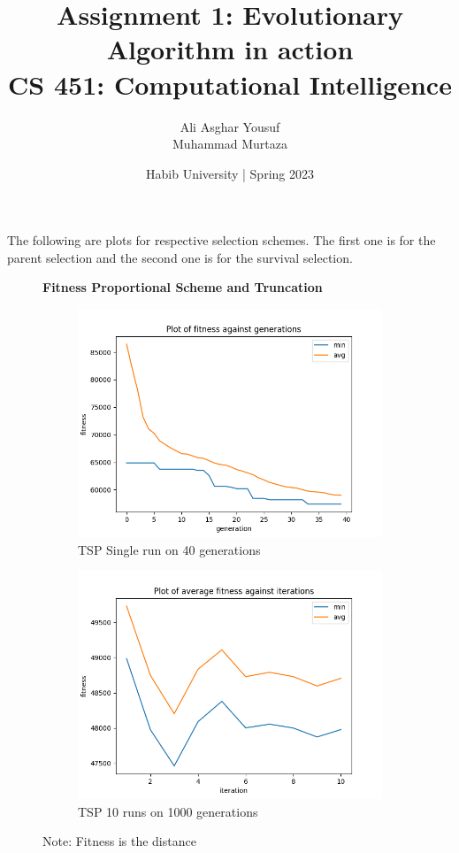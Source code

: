 \documentclass[a4paper]{exam}
\title{Assignment 1: Evolutionary Algorithm in action\\CS 451: Computational Intelligence}
\author{Ali Asghar Yousuf\\Muhammad Murtaza}  %
\date{Habib University | Spring 2023}
\begin{document}
\maketitle

\begin{questions}

  The following are plots for respective selection schemes. The first one is for the parent selection
  and the second one is for the survival selection.

  \begin{figure}[!ht]
    \centering
    \textbf{Fitness Proportional Scheme and Truncation}
    \begin{subfigure}{.5\textwidth}
      \centering
      \includegraphics[width=1\linewidth]{images/tsp_fps_tn_gen.png}
      \caption{TSP Single run on 40 generations}
      \label{fig:tsp_fps_tn_sub1}
    \end{subfigure}%
    \begin{subfigure}{.5\textwidth}
      \centering
      \includegraphics[width=1\linewidth]{images/tsp_fps_tn_itr.png}
      \caption{TSP 10 runs on 1000 generations}
      \label{fig:tsp_fps_tn_sub2}
    \end{subfigure}
    \caption{Note: Fitness is the distance}
    \label{fig:tsp_fps_tn}
  \end{figure}


\end{questions}
\end{document}
